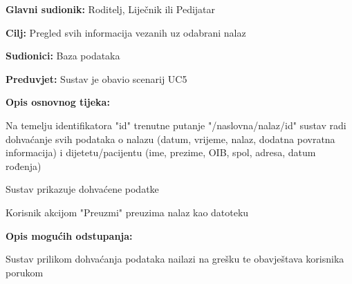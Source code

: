 				
				\noindent {}
				\begin{packed_item}
					
					\item \textbf{Glavni sudionik: }Roditelj, Liječnik ili Pedijatar
					\item  \textbf{Cilj:} Pregled svih informacija vezanih uz odabrani nalaz
					\item  \textbf{Sudionici:} Baza podataka
					\item  \textbf{Preduvjet:} Sustav je obavio scenarij UC5
					\item  \textbf{Opis osnovnog tijeka:}
					
					\item[] \begin{packed_enum}
						\item Na temelju identifikatora "id" trenutne putanje "/naslovna/nalaz/id" sustav radi dohvaćanje svih podataka o nalazu (datum, vrijeme, nalaz, dodatna povratna informacija) i dijetetu/pacijentu (ime, prezime, OIB, spol, adresa, datum rođenja)
						\item Sustav prikazuje dohvaćene podatke
						\item Korisnik akcijom "Preuzmi" preuzima nalaz kao datoteku
					\end{packed_enum}
					
					\item  \textbf{Opis mogućih odstupanja:}
					
					\item[] \begin{packed_item}
						
						\item[1.a] Sustav prilikom dohvaćanja podataka nailazi na grešku te obavještava korisnika porukom	
					\end{packed_item}
					
				\end{packed_item}		
				
				
				
